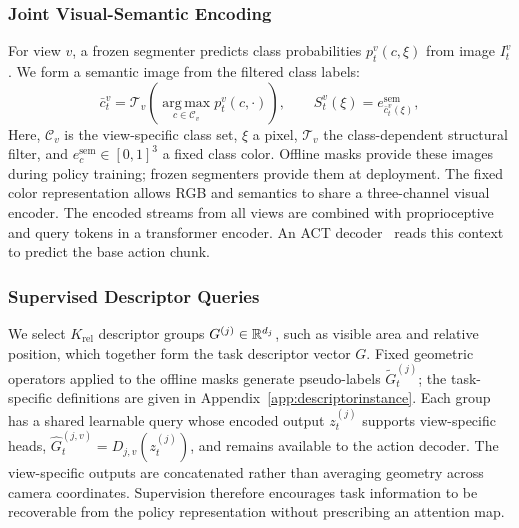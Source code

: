 \subsubsection{Joint Visual-Semantic Encoding}
For view $v$, a frozen segmenter predicts class probabilities $p_t^v(c,\xi)$ from image $I_t^v$.
We form a semantic image from the filtered class labels:
\begin{equation}
 \bar c_t^v=\mathcal T_v\!\left(\operatorname*{arg\,max}_{c\in\mathcal C_v}p_t^v(c,\cdot)\right),
 \qquad S_t^v(\xi)=e_{\bar c_t^v(\xi)}^{\mathrm{sem}},
 \label{eq:methodsoftsem}
\end{equation}
Here, $\mathcal C_v$ is the view-specific class set, $\xi$ a pixel, $\mathcal T_v$ the class-dependent structural filter, and $e_c^{\mathrm{sem}}\in[0,1]^3$ a fixed class color.
Offline masks provide these images during policy training; frozen segmenters provide them at deployment.
The fixed color representation allows RGB and semantics to share a three-channel visual encoder.
The encoded streams from all views are combined with proprioceptive and query tokens in a transformer encoder.
An ACT decoder~\cite{zhao2023act} reads this context to predict the base action chunk.

\subsubsection{Supervised Descriptor Queries}
We select $K_{\mathrm{rel}}$ descriptor groups $G^{(j)}\in\mathbb R^{d_j}$, such as visible area and relative position, which together form the task descriptor vector $G$.
Fixed geometric operators applied to the offline masks generate pseudo-labels $\widetilde G_t^{(j)}$; the task-specific definitions are given in Appendix~\ref{app:descriptorinstance}.
Each group has a shared learnable query whose encoded output $z_t^{(j)}$ supports view-specific heads,
$\widehat G_t^{(j,v)}=D_{j,v}(z_t^{(j)})$, and remains available to the action decoder.
The view-specific outputs are concatenated rather than averaging geometry across camera coordinates.
Supervision therefore encourages task information to be recoverable from the policy representation without prescribing an attention map.

